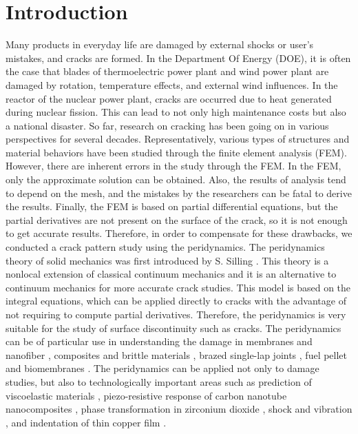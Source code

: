 \section{Introduction}
\label{sec:1}
Many products in everyday life are damaged by external shocks or user's mistakes, and cracks are formed. In the Department Of Energy (DOE), it is often the case that blades of thermoelectric power plant and wind power plant are damaged by rotation, temperature effects, and external wind influences. In the reactor of the nuclear power plant, cracks are occurred due to heat generated during nuclear fission. This can lead to not only high maintenance costs but also a national disaster. So far, research on cracking has been going on in various perspectives for several decades. Representatively, various types of structures and material behaviors have been studied through the finite element analysis (FEM). However, there are inherent errors in the study through the FEM. In the FEM, only the approximate solution can be obtained. Also, the results of analysis tend to depend on the mesh, and the mistakes by the researchers can be fatal to derive the results. Finally, the FEM is based on partial differential equations, but the partial derivatives are not present on the surface of the crack, so it is not enough to get accurate results. Therefore, in order to compensate for these drawbacks, we conducted a crack pattern study using the peridynamics. The peridynamics theory of solid mechanics was first introduced by S. Silling \cite{Ref1,Ref2,Ref3,Ref4}. This theory is a nonlocal extension of classical continuum mechanics and it is an alternative to continuum mechanics for more accurate crack studies. This model is based on the integral equations, which can be applied directly to cracks with the advantage of not requiring to compute partial derivatives. Therefore, the peridynamics is very suitable for the study of surface discontinuity such as cracks. The peridynamics can be of particular use in understanding the damage in membranes and nanofiber \cite{Ref5}, composites and brittle materials \cite{Ref6}, brazed single-lap joints \cite{Ref7}, fuel pellet \cite{Ref8} and biomembranes \cite{Ref9}. The peridynamics can be applied not only to damage studies, but also to technologically important areas such as prediction of viscoelastic materials \cite{Ref10}, piezo-resistive response of carbon nanotube nanocomposites \cite{Ref11}, phase transformation in zirconium dioxide \cite{Ref12}, shock and vibration \cite{Ref13}, and indentation of thin copper film \cite{Ref14}.
